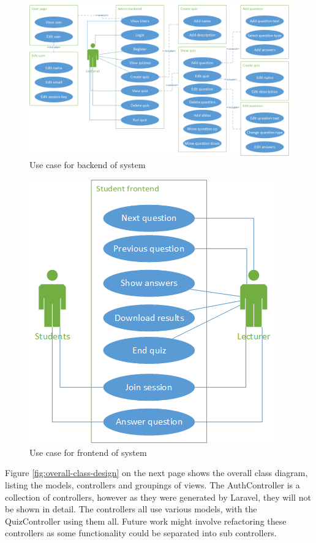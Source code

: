 \begin{figure}
	\caption{Use case for backend of system}
	\centerline{\includegraphics{Chapter3/final-backend-use-case}}
	\label{fig:final-backend-use-case}
\end{figure}

\begin{figure}
	\caption{Use case for frontend of system}
	\centerline{\includegraphics{Chapter3/final-frontend-use-case}}
	\label{fig:final-frontend-use-case}
\end{figure}

\newpage
Figure \ref{fig:overall-class-design} on the next page shows the overall class diagram, listing the models, controllers and groupings of views. The AuthController is a collection of controllers, however as they were generated by Laravel, they will not be shown in detail. The controllers all use various models, with the QuizController using them all. Future work might involve refactoring these controllers as some functionality could be separated into sub controllers.

